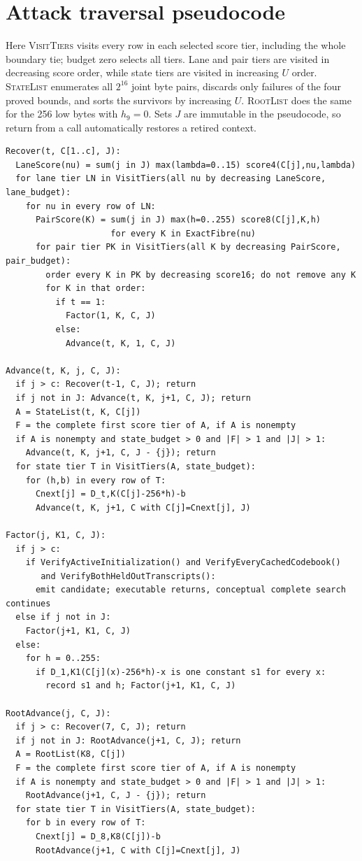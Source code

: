 \documentclass[10pt]{article}
\theoremstyle{plain}
\theoremstyle{definition}
\theoremstyle{remark}
\begin{document}
\appendix
\section{Attack traversal pseudocode}

Here \textsc{VisitTiers} visits every row in each selected score tier, including
the whole boundary tie; budget zero selects all tiers.  Lane and pair tiers are
visited in decreasing score order, while state tiers are visited in increasing
\(U\) order.  \textsc{StateList} enumerates all \(2^{16}\) joint byte pairs,
discards only failures of the four proved bounds, and sorts the survivors by
increasing \(U\).  \textsc{RootList} does the same for the 256 low bytes with
\(h_9=0\).  Sets \(J\) are immutable in the pseudocode, so return from a call
automatically restores a retired context.
\begin{verbatim}
Recover(t, C[1..c], J):
  LaneScore(nu) = sum(j in J) max(lambda=0..15) score4(C[j],nu,lambda)
  for lane tier LN in VisitTiers(all nu by decreasing LaneScore, lane_budget):
    for nu in every row of LN:
      PairScore(K) = sum(j in J) max(h=0..255) score8(C[j],K,h)
                     for every K in ExactFibre(nu)
      for pair tier PK in VisitTiers(all K by decreasing PairScore, pair_budget):
        order every K in PK by decreasing score16; do not remove any K
        for K in that order:
          if t == 1:
            Factor(1, K, C, J)
          else:
            Advance(t, K, 1, C, J)

Advance(t, K, j, C, J):
  if j > c: Recover(t-1, C, J); return
  if j not in J: Advance(t, K, j+1, C, J); return
  A = StateList(t, K, C[j])
  F = the complete first score tier of A, if A is nonempty
  if A is nonempty and state_budget > 0 and |F| > 1 and |J| > 1:
    Advance(t, K, j+1, C, J - {j}); return
  for state tier T in VisitTiers(A, state_budget):
    for (h,b) in every row of T:
      Cnext[j] = D_t,K(C[j]-256*h)-b
      Advance(t, K, j+1, C with C[j]=Cnext[j], J)

Factor(j, K1, C, J):
  if j > c:
    if VerifyActiveInitialization() and VerifyEveryCachedCodebook()
       and VerifyBothHeldOutTranscripts():
      emit candidate; executable returns, conceptual complete search continues
  else if j not in J:
    Factor(j+1, K1, C, J)
  else:
    for h = 0..255:
      if D_1,K1(C[j](x)-256*h)-x is one constant s1 for every x:
        record s1 and h; Factor(j+1, K1, C, J)

RootAdvance(j, C, J):
  if j > c: Recover(7, C, J); return
  if j not in J: RootAdvance(j+1, C, J); return
  A = RootList(K8, C[j])
  F = the complete first score tier of A, if A is nonempty
  if A is nonempty and state_budget > 0 and |F| > 1 and |J| > 1:
    RootAdvance(j+1, C, J - {j}); return
  for state tier T in VisitTiers(A, state_budget):
    for b in every row of T:
      Cnext[j] = D_8,K8(C[j])-b
      RootAdvance(j+1, C with C[j]=Cnext[j], J)


\end{verbatim}
\end{document}
